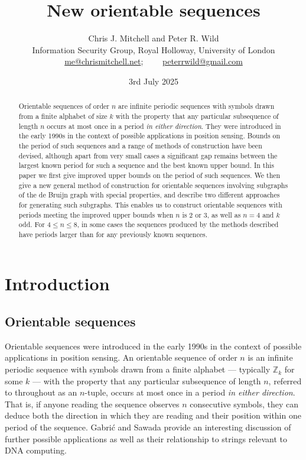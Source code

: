 \documentclass[a4paper,11pt]{article}
\title{New orientable sequences}
\author{Chris J. Mitchell and Peter R. Wild
\\Information Security Group, Royal Holloway, University of London\\
\href{mailto:me@chrismitchell.net}{me@chrismitchell.net};
~~~~\href{mailto:peterrwild@gmail.com}{peterrwild@gmail.com}}
\date{3rd July 2025}
\begin{document}
\maketitle


\begin{abstract}
Orientable sequences of order $n$ are infinite periodic sequences with symbols drawn from a finite
alphabet of size $k$ with the property that any particular subsequence of length $n$ occurs at most
once in a period \emph{in either direction}.  They were introduced in the early 1990s in the
context of possible applications in position sensing. Bounds on the period of such sequences and a
range of methods of construction have been devised, although apart from very small cases a
significant gap remains between the largest known period for such a sequence and the best known
upper bound. In this paper we first give improved upper bounds on the period of such sequences. We
then give a new general method of construction for orientable sequences involving subgraphs of the
de Bruijn graph with special properties, and describe two different approaches for generating such
subgraphs. This enables us to construct orientable sequences with periods meeting the improved
upper bounds when $n$ is 2 or 3, as well as $n=4$ and $k$ odd. For $4\leq n\leq 8$, in some cases
the sequences produced by the methods described have periods larger than for any previously known
sequences.
\end{abstract}

\section{Introduction} \label{section:Introduction}

\subsection{Orientable sequences}

Orientable sequences were introduced in the early 1990s \cite{Burns92,Burns93,Dai93} in the context
of possible applications in position sensing.  An orientable sequence of order $n$ is an infinite
periodic sequence with symbols drawn from a finite alphabet --- typically $\mathbb{Z}_k$ for some
$k$ --- with the property that any particular subsequence of length $n$, referred to throughout as
an $n$-tuple, occurs at most once in a period \emph{in either direction}.  That is, if anyone
reading the sequence observes $n$ consecutive symbols, they can deduce both the direction in which
they are reading and their position within one period of the sequence. Gabri\'{c} and Sawada
\cite{Gabric25} provide an interesting discussion of further possible applications as well as their
relationship to strings relevant to DNA computing.
\end{document}
